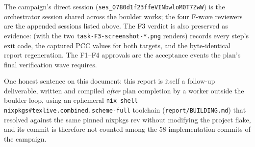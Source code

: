 The campaign's direct session
(\texttt{ses\_0780d1f23ffeVINbwloM0T7ZwW}) is the orchestrator session shared
across the boulder works; the four F-wave reviewers are the appended sessions
listed above. The F3 verdict is also preserved as evidence:
 (with the two
\texttt{task-F3-screenshot-*.png} renders) records every step's exit code, the
captured PCC values for both targets, and the byte-identical report
regeneration. The F1--F4 approvals are the acceptance events the plan's final
verification wave requires.

One honest sentence on this document: this report is itself a follow-up
deliverable, written and compiled \emph{after} plan completion by a worker
outside the boulder loop, using an ephemeral
\texttt{nix shell nixpkgs\#texlive.combined.scheme-full} toolchain
(\texttt{report/BUILDING.md}) that resolved against the same pinned nixpkgs
rev without modifying the project flake, and its commit is therefore not
counted among the 58 implementation commits of the campaign.
